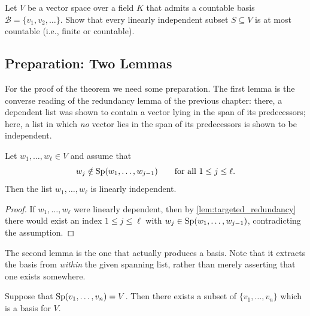 \begin{exercise}
\label{exc:countable_basis_independent_subsets}
Let $V$ be a vector space over a field $K$ that admits a countable basis $\mathcal{B} = \{v_1, v_2, \dots\}$. Show that every linearly independent subset $S \subseteq V$ is at most countable (i.e., finite or countable).
\end{exercise}

\subsection{Preparation: Two Lemmas}

For the proof of the theorem we need some preparation. The first lemma is the converse reading of the redundancy lemma of the previous chapter: there, a dependent list was shown to contain a vector lying in the span of its predecessors; here, a list in which \emph{no} vector lies in the span of its predecessors is shown to be independent.

\begin{lemma}
\label{lem:no_predecessor_span}
Let $w_1, \dots, w_\ell \in V$ and assume that
\[
w_j \notin \operatorname{Sp}(w_1, \dots, w_{j-1}) \qquad \text{for all } 1 \le j \le \ell.
\]
Then the list $w_1, \dots, w_\ell$ is linearly independent.
\end{lemma}

\begin{proof}
If $w_1, \dots, w_\ell$ were linearly dependent, then by \cref{lem:targeted_redundancy} there would exist an index $1 \le j \le \ell$ with $w_j \in \operatorname{Sp}(w_1, \dots, w_{j-1})$, contradicting the assumption.
\end{proof}

The second lemma is the one that actually produces a basis. Note that it extracts the basis from \emph{within} the given spanning list, rather than merely asserting that one exists somewhere.

\begin{lemma}
\label{lem:spanning_list_contains_basis}
Suppose that $\operatorname{Sp}(v_1, \dots, v_n) = V$. Then there exists a subset of $\{v_1, \dots, v_n\}$ which is a basis for $V$.
\end{lemma}

